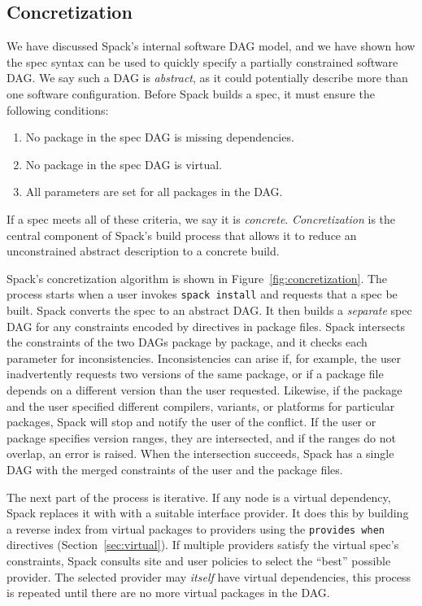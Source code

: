 
\subsection{Concretization}
\label{sec:concretization}

We have discussed Spack's internal software DAG model, and we have shown
how the spec syntax can be used to quickly specify a partially constrained
software DAG.  We say such a DAG is {\it abstract}, as it could potentially
describe more than one software configuration. Before Spack builds a spec, it
must ensure the following conditions:
\begin{enumerate}
\item No package in the spec DAG is missing dependencies.
\item No package in the spec DAG is virtual.
\item All parameters are set for all packages in the DAG.
\end{enumerate}
If a spec meets all of these criteria, we say it is {\it concrete}.
{\it Concretization} is the central component of Spack's build
process that allows it to reduce an unconstrained abstract
description to a concrete build.

Spack's concretization algorithm is shown in Figure~\ref{fig:concretization}.
The process starts when a user invokes {\tt spack install} and requests that a
spec be built.  Spack converts the spec to an abstract DAG.
It then builds a {\it separate} spec DAG for any constraints encoded
by directives in package files.
%
Spack intersects the constraints of the two DAGs package by package, and it
checks each parameter for inconsistencies.  Inconsistencies can arise if, for example,
the user inadvertently requests two versions of the same package, or if a
package file depends on a different version than the user requested.
Likewise, if the package and the user specified different compilers, variants,
or platforms for particular packages, Spack will stop and notify
the user of the conflict. If the user or package specifies version ranges,
they are intersected, and if the ranges do not overlap, an error is raised.
When the intersection succeeds, Spack has a single DAG with the merged
constraints of the user and the package files.

The next part of the process is iterative.
If any node is a virtual dependency, Spack replaces it with with a
suitable interface provider.  It does this by building a reverse
index from virtual packages to providers using the {\tt provides when}
directives (Section~\ref{sec:virtual}). If multiple providers
satisfy the virtual spec's constraints,
Spack consults site and user policies to select the ``best'' possible
provider.  The selected provider may {\it itself} have virtual dependencies,
this process is repeated until there are no more virtual packages in the DAG.

